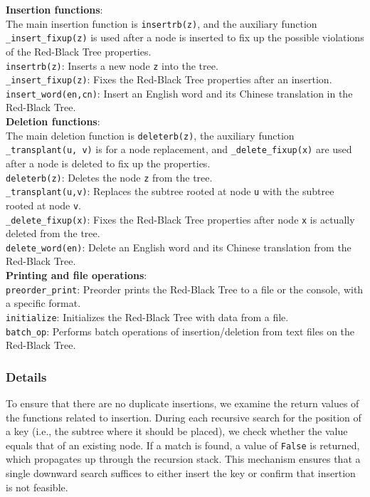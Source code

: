 \documentclass[UTF8]{ctexart}
\begin{document}
\textbf{Insertion functions}:\\
The main insertion function is \texttt{insertrb(z)}, and the auxiliary function \texttt{\_insert\_fixup(z)} is used after
a node is inserted to fix up the possible violations of the Red-Black Tree properties.\\
\texttt{insertrb(z)}: Inserts a new node \texttt{z} into the tree.\\
\texttt{\_insert\_fixup(z)}: Fixes the Red-Black Tree properties after an insertion.\\
\texttt{insert\_word(en,cn)}: Insert an English word and its Chinese translation in the Red-Black Tree.\\

\textbf{Deletion functions}:\\
The main deletion function is \texttt{deleterb(z)}, the auxiliary function \texttt{\_transplant(u, v)} is for
a node replacement, and \texttt{\_delete\_fixup(x)} are used after a node is deleted to fix up the properties.\\
\texttt{deleterb(z)}: Deletes the node \texttt{z} from the tree.\\
\texttt{\_transplant(u,v)}: Replaces the subtree rooted at node \texttt{u} with the subtree rooted at node \texttt{v}.\\
\texttt{\_delete\_fixup(x)}: Fixes the Red-Black Tree properties after node \texttt{x} is actually deleted from the tree.\\
\texttt{delete\_word(en)}: Delete an English word and its Chinese translation from the Red-Black Tree.\\

\textbf{Printing and file operations}:\\
\texttt{preorder\_print}: Preorder prints the Red-Black Tree to a file or the console, with a specific format.\\
\texttt{initialize}: Initializes the Red-Black Tree with data from a file.\\
\texttt{batch\_op}: Performs batch operations of insertion/deletion from text files on the Red-Black Tree.\\

\subsubsection*{Details}
To ensure that there are no duplicate insertions, we examine the return values of the functions related to insertion. During each recursive search for the position of a key (i.e., the subtree where it should be placed), we check whether the value equals that of an existing node. If a match is found, a value of \texttt{False} is returned, which propagates up through the recursion stack. This mechanism ensures that a single downward search suffices to either insert the key or confirm that insertion is not feasible. 
\end{document}

